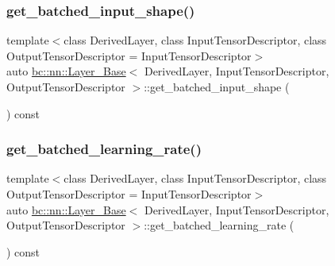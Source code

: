 \mbox{\label{structbc_1_1nn_1_1Layer__Base_ae9e5a56e554fe06a071429670f6109dd}} 
\subsubsection{\texorpdfstring{get\+\_\+batched\+\_\+input\+\_\+shape()}{get\_batched\_input\_shape()}}
{\footnotesize\ttfamily template$<$class Derived\+Layer, class Input\+Tensor\+Descriptor, class Output\+Tensor\+Descriptor = Input\+Tensor\+Descriptor$>$ \\
auto \hyperlink{structbc_1_1nn_1_1Layer__Base}{bc\+::nn\+::\+Layer\+\_\+\+Base}$<$ Derived\+Layer, Input\+Tensor\+Descriptor, Output\+Tensor\+Descriptor $>$\+::get\+\_\+batched\+\_\+input\+\_\+shape (\begin{DoxyParamCaption}{ }\end{DoxyParamCaption}) const\hspace{0.3cm}{\ttfamily [inline]}}

\mbox{\label{structbc_1_1nn_1_1Layer__Base_ae5fa2f2b97ec87c82cd98691dcb1ea91}} 
\subsubsection{\texorpdfstring{get\+\_\+batched\+\_\+learning\+\_\+rate()}{get\_batched\_learning\_rate()}}
{\footnotesize\ttfamily template$<$class Derived\+Layer, class Input\+Tensor\+Descriptor, class Output\+Tensor\+Descriptor = Input\+Tensor\+Descriptor$>$ \\
auto \hyperlink{structbc_1_1nn_1_1Layer__Base}{bc\+::nn\+::\+Layer\+\_\+\+Base}$<$ Derived\+Layer, Input\+Tensor\+Descriptor, Output\+Tensor\+Descriptor $>$\+::get\+\_\+batched\+\_\+learning\+\_\+rate (\begin{DoxyParamCaption}{ }\end{DoxyParamCaption}) const\hspace{0.3cm}{\ttfamily [inline]}}

